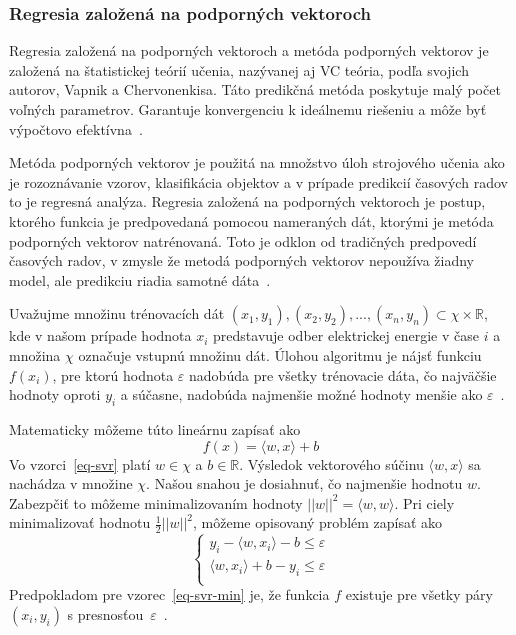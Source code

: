 \documentclass[a4paper,slovak,12pt,appendix]{article}
\begin{document}

\subsubsection{Regresia založená na podporných vektoroch}
Regresia založená na podporných vektoroch a metóda podporných vektorov je
založená na štatistickej teórií učenia, nazývanej aj VC teória, podľa svojich
autorov, Vapnik a Chervonenkisa. Táto predikčná metóda poskytuje malý počet
voľných parametrov. Garantuje konvergenciu k ideálnemu riešeniu a môže byť
výpočtovo efektívna~\cite{Sapankevych2009}.

Metóda podporných vektorov je použitá na množstvo úloh strojového učenia ako je
rozoznávanie vzorov, klasifikácia objektov a v prípade predikcií časových
radov to je regresná analýza. Regresia založená na podporných vektoroch je
postup, ktorého funkcia je predpovedaná pomocou nameraných dát, ktorými je
metóda podporných vektorov natrénovaná. Toto je odklon od tradičných predpovedí
časových radov, v zmysle že metodá podporných vektorov nepoužíva žiadny model,
ale predikciu riadia samotné dáta~\cite{Sapankevych2009}.

Uvažujme množinu trénovacích dát
${(x_1, y_1), (x_2, y_2), ..., (x_n, y_n)} \subset \chi \times \mathbb{R}$, kde
v našom prípade hodnota $x_i$ predstavuje odber elektrickej energie v čase $i$
a množina $\chi$ označuje vstupnú množinu dát. Úlohou algoritmu je nájsť
funkciu  $f(x_i)$, pre ktorú hodnota $\varepsilon$ nadobúda pre všetky
trénovacie dáta, čo najväčšie hodnoty oproti $y_i$ a súčasne, nadobúda
najmenšie možné hodnoty menšie ako $\varepsilon$~\cite{Smola2004}.

Matematicky môžeme túto lineárnu zapísať ako
\begin{equation}
  f(x) = \langle w, x \rangle +  b
  \label{eq-svr}
\end{equation}
Vo vzorci~\ref{eq-svr} platí $w \in \chi$ a $b \in \mathbb{R}$. Výsledok
vektorového súčinu $\langle w, x \rangle$ sa nachádza v množine $\chi$. Našou
snahou je dosiahnuť, čo najmenšie hodnotu $w$. Zabezpčiť to môžeme
minimalizovaním hodnoty $|| w ||^2 = \langle w, w \rangle$. Pri ciely
minimalizovať hodnotu $\frac{1}{2} || w ||^2$, môžeme opisovaný problém zapísať
ako
\begin{equation}
  \begin{cases}
    y_i - \langle w, x_i \rangle - b \leq \varepsilon \\
    \langle w, x_i \rangle + b - y_i \leq \varepsilon \\
  \end{cases}
  \label{eq-svr-min}
\end{equation}
Predpokladom pre vzorec~\ref{eq-svr-min} je, že funkcia $f$ existuje pre všetky
páry $(x_i, y_i)$ s presnosťou~$\varepsilon$~\cite{Smola2004}.
\end{document}
